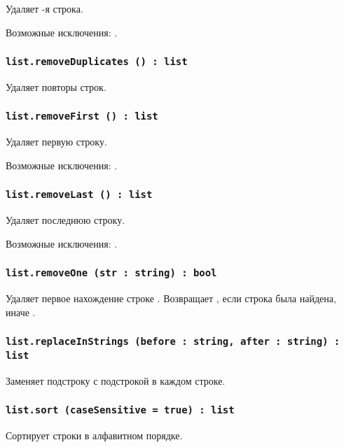Удаляет -я строка.

Возможные исключения: .

\subsubsection{\lstinline|list.removeDuplicates () : list|}

Удаляет повторы строк.

\subsubsection{\lstinline|list.removeFirst () : list|}

Удаляет первую строку.

Возможные исключения: .

\subsubsection{\lstinline|list.removeLast () : list|}

Удаляет последнюю строку.

Возможные исключения: .

\subsubsection{\lstinline|list.removeOne (str : string) : bool|}

Удаляет первое нахождение строке . Возвращает \true, если строка была найдена, иначе \false.

\subsubsection{\lstinline|list.replaceInStrings (before : string, after : string) : list|}

Заменяет подстроку  с подстрокой  в каждом строке.

\subsubsection{\lstinline|list.sort (caseSensitive = true) : list|}

Сортирует строки в алфавитном порядке.

